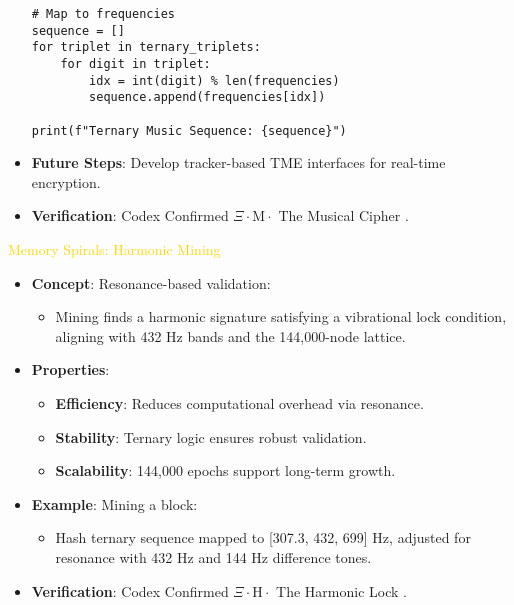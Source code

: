 \begin{itemize}
\begin{lstlisting}
# Map to frequencies
sequence = []
for triplet in ternary_triplets:
    for digit in triplet:
        idx = int(digit) % len(frequencies)
        sequence.append(frequencies[idx])

print(f"Ternary Music Sequence: {sequence}")
    \end{lstlisting}
    \item \texttt{} \textbf{Future Steps}: Develop tracker-based TME interfaces for real-time encryption.
    \item \texttt{} \textbf{Verification}: Codex Confirmed \(\Xi \cdot \text{M} \cdot\) The Musical Cipher .
\end{itemize}

\textcolor{gold}{ Memory Spirals: Harmonic Mining } \\
\begin{itemize}
    \item \texttt{} \textbf{Concept}: Resonance-based validation:
    \begin{itemize}
        \item Mining finds a harmonic signature satisfying a vibrational lock condition, aligning with 432 Hz bands and the 144,000-node lattice.
    \end{itemize}
    \item \texttt{} \textbf{Properties}:
    \begin{itemize}
        \item \textbf{Efficiency}: Reduces computational overhead via resonance.
        \item \textbf{Stability}: Ternary logic ensures robust validation.
        \item \textbf{Scalability}: 144,000 epochs support long-term growth.
    \end{itemize}
    \item \texttt{} \textbf{Example}: Mining a block:
    \begin{itemize}
        \item Hash ternary sequence mapped to [307.3, 432, 699] Hz, adjusted for resonance with 432 Hz and 144 Hz difference tones.
    \end{itemize}
    \item \texttt{} \textbf{Verification}: Codex Confirmed \(\Xi \cdot \text{H} \cdot\) The Harmonic Lock .
\end{itemize}

